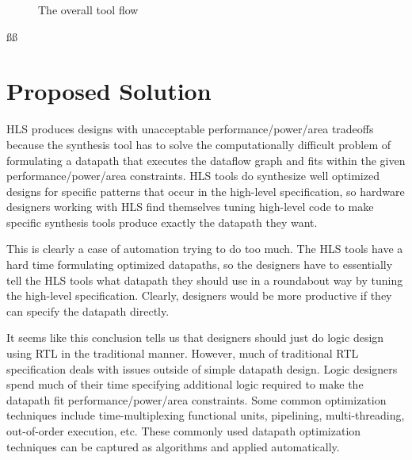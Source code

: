 \begin{figure}
	\centering
    \caption{The overall tool flow}
	\label{fig:workflow}
\end{figure}
ßß
\section{Proposed Solution}
HLS produces designs with unacceptable performance/power/area tradeoffs because the synthesis tool has to solve the computationally difficult problem of formulating a datapath that executes the dataflow graph and fits within the given performance/power/area constraints. HLS tools do synthesize well optimized designs for specific patterns that occur in the high-level specification, so hardware designers working with HLS find themselves tuning high-level code to make specific synthesis tools produce exactly the datapath they want. 

This is clearly a case of automation trying to do too much. The HLS tools have a hard time formulating optimized datapaths, so the designers have to essentially tell the HLS tools what datapath they should use in a roundabout way by tuning the high-level specification. Clearly, designers would be more productive if they can specify the datapath directly. 

It seems like this conclusion tells us that designers should just do logic design using RTL in the traditional manner. However, much of traditional RTL specification deals with issues outside of simple datapath design. Logic designers spend much of their time specifying additional logic required to make the datapath fit performance/power/area constraints. Some common optimization techniques include time-multiplexing functional units, pipelining, multi-threading, out-of-order execution, etc. These commonly used datapath optimization techniques can be captured as algorithms and applied automatically.

